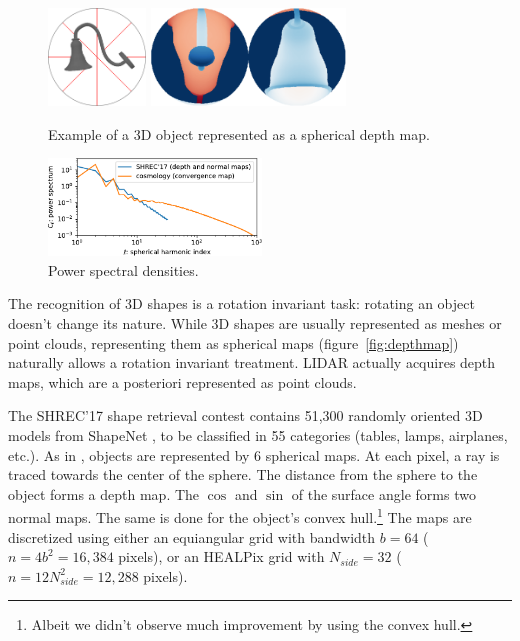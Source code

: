 \documentclass{article} %
\newcommand{\todo}[1]{{\color[rgb]{.6,.1,.6}{#1}}}
\renewcommand{\figref}[1]{figure~\ref{fig:#1}}
\begin{document}
\begin{figure}
	\begin{minipage}[t]{0.57\linewidth}
		\centering
		\includegraphics[height=7em]{lamp_000018}
		\hfill
		\includegraphics[height=7em]{lamp_000018_sphere_nobar}
		\caption{Example of a 3D object represented as a spherical depth map.}
		\label{fig:depthmap}
	\end{minipage}
	\hfill
	\begin{minipage}[t]{0.35\linewidth}
		\centering
		\includegraphics[height=7em]{spectrum}
		\caption{Power spectral densities.}
		\label{fig:spectrum}
	\end{minipage}
\end{figure}

The recognition of 3D shapes is a rotation invariant task: rotating an object doesn't change its nature.
While 3D shapes are usually represented as meshes or point clouds, representing them as spherical maps (\figref{depthmap}) naturally allows a rotation invariant treatment.
LIDAR actually acquires depth maps, which are a posteriori represented as point clouds.
\todo{move to intro?}

The SHREC'17 shape retrieval contest \citep{shrec17} contains 51,300 randomly oriented 3D models from ShapeNet \citep{shapenet}, to be classified in 55 categories (tables, lamps, airplanes, etc.).
As in \citet{cohen2018sphericalcnn}, objects are represented by 6 spherical maps.
At each pixel, a ray is traced towards the center of the sphere.
The distance from the sphere to the object forms a depth map.
The $\cos$ and $\sin$ of the surface angle forms two normal maps.
The same is done for the object's convex hull.\footnote{Albeit we didn't observe much improvement by using the convex hull.}
The maps are discretized using either an equiangular grid \citep{driscoll1994Fouriersphere} with bandwidth $b = 64$ ($n = 4 b^2 = 16,384$ pixels), or an HEALPix \citep{healpix} grid with $N_{side} = 32$ ($n = 12 N_{side}^2 = 12,288$ pixels).
\end{document}
